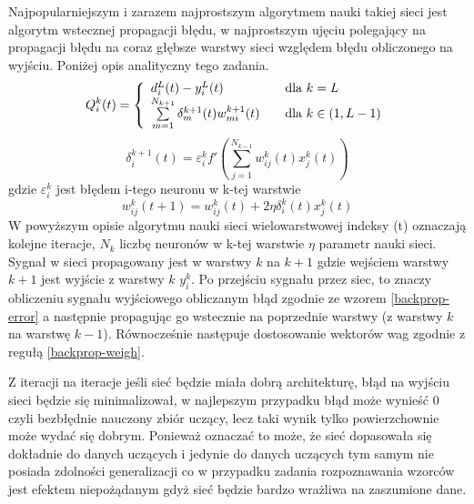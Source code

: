 \documentclass{classrep}
\begin{document}
Najpopularniejszym i zarazem najprostszym algorytmem nauki takiej sieci jest algorytm wstecznej propagacji błędu, w najprostszym ujęciu polegający na propagacji błędu na coraz głębsze warstwy sieci względem błędu obliczonego na wyjściu.
Poniżej opis analityczny tego zadania.
\begin{equation}
\label{backprop-error}
Q ^{k} _{i} (t)  = \left\{ 
   \begin{array}{l l}
     d^{L} _{i}(t) - y^{L} _{i}(t) & \quad \text{dla $k=L$}\\
     \sum \limits ^{N_{k+1}} _{m=1} \delta ^{k+1}_{m}(t) w^{k+1} _{mi}(t) & \quad \text{dla $k \in (1,L-1)$}\\
   \end{array} \right.
\end{equation}
\begin{equation}
\delta ^{k+1}_{i}(t) = \varepsilon ^{k} _{i} f' \left( \sum \limits ^{N _{k-1}} _{j=1} w^{k} _{ij}(t) x^{k} _{j} (t) \right) 
\end{equation}
gdzie $\varepsilon ^{k} _{i}$ jest błędem i-tego neuronu w k-tej warstwie
\begin{equation}
\label{backprop-weigh}
w^{k} _{ij} (t+1) = w^{k} _{ij} (t) + 2 \eta \delta ^{k}_{i}(t) x^{k} _{j} (t)
\end{equation}
W powyższym opisie algorytmu nauki sieci wielowarstwowej indeksy (t) oznaczają kolejne iteracje, $N_k$ liczbę neuronów w k-tej warstwie $\eta$ parametr nauki sieci.\\
Sygnał w sieci propagowany jest w warstwy $k$ na $k+1$ gdzie wejściem warstwy $k+1$ jest wyjście z warstwy $k$ $y^{k} _{i}$. Po przejściu sygnału przez siec, to znaczy obliczeniu sygnału wyjściowego obliczanym błąd zgodnie ze wzorem \ref{backprop-error} a następnie propagując go wstecznie na poprzednie warstwy (z warstwy $k$ na warstwę $k-1$). Równocześnie następuje dostosowanie wektorów wag zgodnie z regułą \ref{backprop-weigh}.

Z iteracji na iteracje jeśli sieć będzie miała dobrą architekturę, błąd na wyjściu sieci będzie się minimalizował, w najlepszym przypadku błąd może wynieść 0 czyli bezbłędnie nauczony zbiór uczący, lecz taki wynik tylko powierzchownie może wydać się dobrym. Ponieważ oznaczać to może, że sieć dopasowała się dokładnie do danych uczących i jedynie do danych uczących tym samym nie posiada zdolności generalizacji co w przypadku zadania rozpoznawania wzorców jest efektem niepożądanym gdyż sieć będzie bardzo wrażliwa na zaszumione dane.
\end{document}
